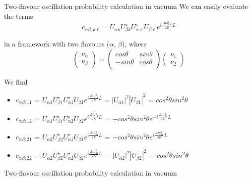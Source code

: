 {\begin{frame}{Two-flavour oscillation probability calculation in vacuum}
We can easily evaluate the terms
\begin{equation*}
  c_{\alpha \beta; k \ell} =
   U_{{\alpha}k} U^{\star}_{{\beta}k}
   U^{\star}_{{\alpha}\ell} U_{{\beta}\ell}
   e^{i \frac{\Delta m^{2}_{k \ell}}{2E}L}
\end{equation*}

in a framework with two flavours ($\alpha$, $\beta$), where
\begin{equation}
 \nonumber
 \begin{pmatrix}
  \nu_{\alpha}\\ \nu_{\beta}
 \end{pmatrix}
 =
 \begin{pmatrix}
   cos\theta & sin\theta \\
  -sin\theta & cos\theta \\
 \end{pmatrix}
 \begin{pmatrix}
  \nu_{1}\\ \nu_{2}
 \end{pmatrix}
\end{equation}

We find
\begin{itemize}
\small
  \item
  $c_{\alpha \beta; 11}$ =
  $U_{{\alpha}1} U^{\star}_{{\beta}1}
   U^{\star}_{{\alpha}1} U_{{\beta}1}
   e^{i \frac{\Delta m^{2}_{11}}{2E}L} =
   |U_{{\alpha}1}|^2 |U_{{\beta}1}|^2$ =
   $cos^2\theta sin^2\theta$
  \item
  $c_{\alpha \beta; 12}$ =
  $U_{{\alpha}1} U^{\star}_{{\beta}1}
  U^{\star}_{{\alpha}2} U_{{\beta}2}
  e^{i \frac{\Delta m^{2}_{12}}{2E}L}$ =
  $- cos^2\theta sin^2\theta
  e^{-i \frac{\Delta m^{2}_{21}}{2E}L}$
  \item
  $c_{\alpha \beta; 21}$ =
  $U_{{\alpha}2} U^{\star}_{{\beta}2}
  U^{\star}_{{\alpha}1} U_{{\beta}1}
  e^{i \frac{\Delta m^{2}_{21}}{2E}L}$ =
  $- cos^2\theta sin^2\theta
  e^{i \frac{\Delta m^{2}_{21}}{2E}L}$
  \item
  $c_{\alpha \beta; 22}$ =
  $U_{{\alpha}2} U^{\star}_{{\beta}2}
  U^{\star}_{{\alpha}2} U_{{\beta}2}
  e^{i \frac{\Delta m^{2}_{22}}{2E}L}$ =
  $|U_{{\alpha}2}|^2 |U_{{\beta}2}|^2$ =
  $cos^2\theta sin^2\theta$
\end{itemize}

\end{frame}

%
%
%

\begin{frame}{Two-flavour oscillation probability calculation in vacuum}


\end{frame}}
